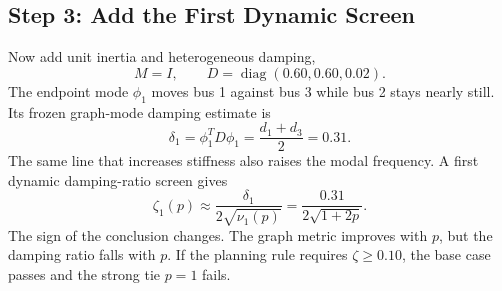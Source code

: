 \subsection{Step 3: Add the First Dynamic Screen}

Now add unit inertia and heterogeneous damping,
\begin{equation}
  M=I,\qquad
  D=\operatorname{diag}(0.60,0.60,0.02).
  \label{eq:framework_three_bus_MD}
\end{equation}
The endpoint mode \(\phi_1\) moves bus 1 against bus 3 while bus 2 stays nearly
still. Its frozen graph-mode damping estimate is
\begin{equation}
  \delta_1=\phi_1^TD\phi_1
  =\frac{d_1+d_3}{2}
  =0.31 .
  \label{eq:framework_three_bus_modal_damping}
\end{equation}
The same line that increases stiffness also raises the modal frequency. A
first dynamic damping-ratio screen gives
\begin{equation}
  \zeta_1(p)\approx
  \frac{\delta_1}{2\sqrt{\nu_1(p)}}
  =
  \frac{0.31}{2\sqrt{1+2p}} .
  \label{eq:framework_three_bus_zeta}
\end{equation}
The sign of the conclusion changes. The graph metric improves with \(p\), but
the damping ratio falls with \(p\). If the planning rule requires
\(\zeta\ge 0.10\), the base case passes and the strong tie \(p=1\) fails.


